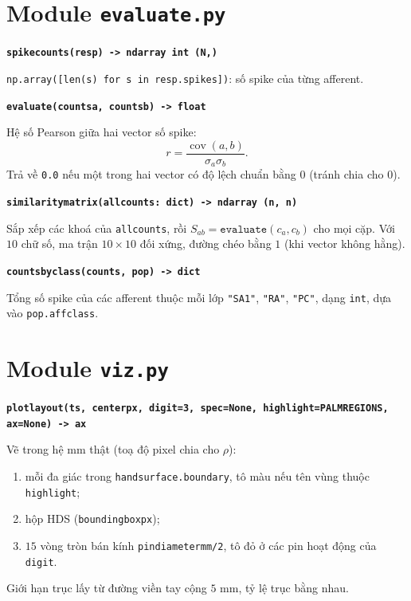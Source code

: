 \documentclass[11pt,a4paper]{article}
\renewcommand{\_}{\textunderscore\hspace{0pt}}
\newcommand{\code}[1]{\texttt{#1}}
\newcommand{\sig}[1]{\par\smallskip\noindent\textbf{\texttt{#1}}\par\nopagebreak}
\begin{document}
\section{Module \texttt{evaluate.py}}

\sig{spike\_counts(resp) -> ndarray int (N,)}
\code{np.array([len(s) for s in resp.spikes])}: số spike của từng afferent.

\sig{evaluate(counts\_a, counts\_b) -> float}
Hệ số Pearson giữa hai vector số spike:
\begin{equation}
r=\frac{\operatorname{cov}(a,b)}{\sigma_a\sigma_b}.
\end{equation}
Trả về \code{0.0} nếu một trong hai vector có độ lệch chuẩn bằng $0$ (tránh chia cho $0$).

\sig{similarity\_matrix(all\_counts: dict) -> ndarray (n, n)}
Sắp xếp các khoá của \code{all\_counts}, rồi $S_{ab}=\code{evaluate}(c_a,c_b)$ cho mọi cặp. Với $10$ chữ số, ma trận $10\times10$ đối xứng, đường chéo bằng $1$ (khi vector không hằng).

\sig{counts\_by\_class(counts, pop) -> dict}
Tổng số spike của các afferent thuộc mỗi lớp \code{"SA1"}, \code{"RA"}, \code{"PC"}, dạng \code{int}, dựa vào \code{pop.affclass}.

\section{Module \texttt{viz.py}}
\sig{plot\_layout(ts, center\_px, digit=3, spec=None, highlight=PALM\_REGIONS, ax=None) -> ax}
Vẽ trong hệ mm thật (toạ độ pixel chia cho $\rho$):
\begin{enumerate}
\item mỗi đa giác trong \code{hand\_surface.boundary}, tô màu nếu tên vùng thuộc \code{highlight};
\item hộp HDS (\code{bounding\_box\_px});
\item $15$ vòng tròn bán kính \code{pin\_diameter\_mm/2}, tô đỏ ở các pin hoạt động của \code{digit}.
\end{enumerate}
Giới hạn trục lấy từ đường viền tay cộng $5$ mm, tỷ lệ trục bằng nhau.

\end{document}
